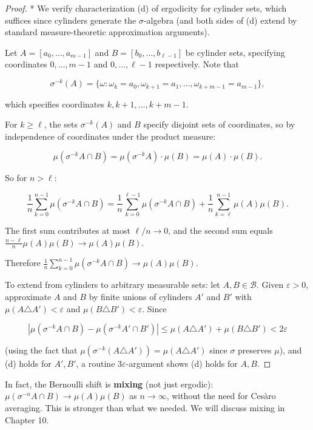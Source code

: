 \begin{proof}
* We verify characterization (d) of ergodicity for cylinder sets, which suffices since cylinders generate the $\sigma$-algebra (and both sides of (d) extend by standard measure-theoretic approximation arguments).

Let $A = [a_0, \ldots, a_{m-1}]$ and $B = [b_0, \ldots, b_{\ell-1}]$ be cylinder sets, specifying coordinates $0, \ldots, m-1$ and $0, \ldots, \ell-1$ respectively. Note that

\[
\sigma^{-k}(A) = \{\omega : \omega_{k} = a_0, \omega_{k+1} = a_1, \ldots, \omega_{k+m-1} = a_{m-1}\},
\]

which specifies coordinates $k, k+1, \ldots, k+m-1$.

For $k \geq \ell$, the sets $\sigma^{-k}(A)$ and $B$ specify disjoint sets of coordinates, so by independence of coordinates under the product measure:

\[
\mu(\sigma^{-k}A \cap B) = \mu(\sigma^{-k}A) \cdot \mu(B) = \mu(A) \cdot \mu(B).
\]

So for $n > \ell$:

\[
\frac{1}{n}\sum_{k=0}^{n-1} \mu(\sigma^{-k}A \cap B) = \frac{1}{n}\sum_{k=0}^{\ell-1} \mu(\sigma^{-k}A \cap B) + \frac{1}{n}\sum_{k=\ell}^{n-1} \mu(A)\mu(B).
\]

The first sum contributes at most $\ell/n \to 0$, and the second sum equals $\frac{n - \ell}{n}\mu(A)\mu(B) \to \mu(A)\mu(B)$.

Therefore $\frac{1}{n}\sum_{k=0}^{n-1}\mu(\sigma^{-k}A \cap B) \to \mu(A)\mu(B)$.

To extend from cylinders to arbitrary measurable sets: let $A, B \in \mathcal{B}$. Given $\varepsilon > 0$, approximate $A$ and $B$ by finite unions of cylinders $A'$ and $B'$ with $\mu(A \triangle A') < \varepsilon$ and $\mu(B \triangle B') < \varepsilon$. Since

\[
|\mu(\sigma^{-k}A \cap B) - \mu(\sigma^{-k}A' \cap B')| \leq \mu(A \triangle A') + \mu(B \triangle B') < 2\varepsilon
\]

(using the fact that $\mu(\sigma^{-k}(A \triangle A')) = \mu(A \triangle A')$ since $\sigma$ preserves $\mu$), and (d) holds for $A', B'$, a routine $3\varepsilon$-argument shows (d) holds for $A, B$.
\end{proof}


\begin{remark}
In fact, the Bernoulli shift is \textbf{mixing} (not just ergodic): $\mu(\sigma^{-n}A \cap B) \to \mu(A)\mu(B)$ as $n \to \infty$, without the need for Cesàro averaging. This is stronger than what we needed. We will discuss mixing in Chapter 10.
\end{remark}


